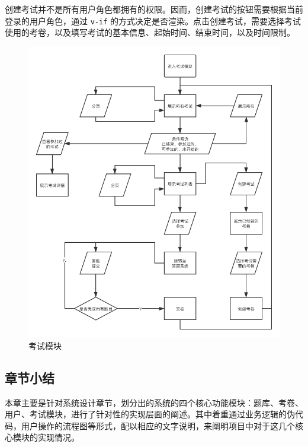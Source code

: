 创建考试并不是所有用户角色都拥有的权限。因而，创建考试的按钮需要根据当前登录的用户角色，通过 
\lstinline!v-if! 的方式决定是否渲染。点击创建考试，需要选择考试使用的考卷，以及填写考试的基本信息、起始时间、结束时间，以及时间限制。

\begin{figure}[ht!]
    \centering
    \includegraphics[width=\linewidth]{_images/考试模块.png}
    \caption{考试模块}
\end{figure}


\subsection{章节小结}
本章主要是针对系统设计章节，划分出的系统的四个核心功能模块：题库、考卷、用户、考试模块，进行了针对性的实现层面的阐述。其中着重通过业务逻辑的伪代码，用户操作的流程图等形式，配以相应的文字说明，来阐明项目中对于这几个核心模块的实现情况。